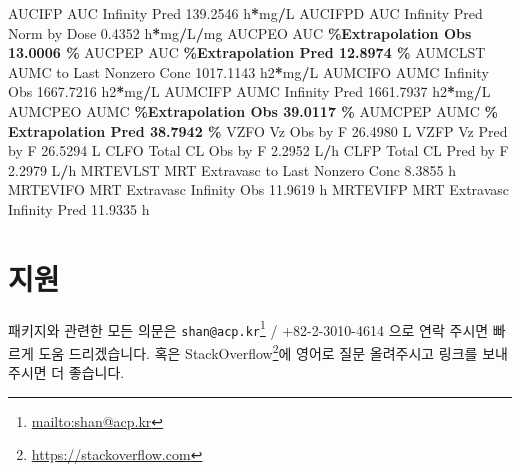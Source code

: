 \documentclass[
  10pt,
]{krantz}
\makeatletter
\newenvironment{Shaded}{\begin{snugshade}}{\end{snugshade}}
\newcommand{\FloatTok}[1]{\textcolor[rgb]{0.00,0.00,0.81}{#1}}
\newcommand{\NormalTok}[1]{#1}
\newcommand{\OperatorTok}[1]{\textcolor[rgb]{0.81,0.36,0.00}{\textbf{#1}}}
\renewcommand{\href}[2]{#2\footnote{\url{#1}}}
\newenvironment{kframe}{%
\medskip{}
\setlength{\fboxsep}{.8em}
 \def\at@end@of@kframe{}%
 \ifinner\ifhmode%
  \def\at@end@of@kframe{\end{minipage}}%
  \begin{minipage}{\columnwidth}%
 \fi\fi%
 \def\FrameCommand##1{\hskip\@totalleftmargin \hskip-\fboxsep
 \colorbox{shadecolor}{##1}\hskip-\fboxsep
     \hskip-\linewidth \hskip-\@totalleftmargin \hskip\columnwidth}%
 \MakeFramed {\advance\hsize-\width
   \@totalleftmargin\z@ \linewidth\hsize
   \@setminipage}}%
 {\par\unskip\endMakeFramed%
 \at@end@of@kframe}
\renewenvironment{Shaded}{\begin{kframe}}{\end{kframe}}
\makeatother
\begin{document}
\begin{Shaded}
\begin{Highlighting}[]
\NormalTok{AUCIFP     AUC Infinity Pred                             }\FloatTok{139.2546}\NormalTok{ h}\OperatorTok{*}\NormalTok{mg}\OperatorTok{/}\NormalTok{L}
\NormalTok{AUCIFPD    AUC Infinity Pred Norm by Dose                  }\FloatTok{0.4352}\NormalTok{ h}\OperatorTok{*}\NormalTok{mg}\OperatorTok{/}\NormalTok{L}\OperatorTok{/}\NormalTok{mg}
\NormalTok{AUCPEO     AUC }\OperatorTok{\%Extrapolation Obs                         13.0006 \%}
\NormalTok{AUCPEP     AUC }\OperatorTok{\%Extrapolation Pred                        12.8974 \%}
\NormalTok{AUMCLST    AUMC to Last Nonzero Conc                    }\FloatTok{1017.1143}\NormalTok{ h2}\OperatorTok{*}\NormalTok{mg}\OperatorTok{/}\NormalTok{L}
\NormalTok{AUMCIFO    AUMC Infinity Obs                            }\FloatTok{1667.7216}\NormalTok{ h2}\OperatorTok{*}\NormalTok{mg}\OperatorTok{/}\NormalTok{L}
\NormalTok{AUMCIFP    AUMC Infinity Pred                           }\FloatTok{1661.7937}\NormalTok{ h2}\OperatorTok{*}\NormalTok{mg}\OperatorTok{/}\NormalTok{L}
\NormalTok{AUMCPEO    AUMC }\OperatorTok{\%Extrapolation Obs                        39.0117 \%}
\NormalTok{AUMCPEP    AUMC }\OperatorTok{\% Extrapolation Pred                      38.7942 \%}
\NormalTok{VZFO       Vz Obs by F                                    }\FloatTok{26.4980}\NormalTok{ L}
\NormalTok{VZFP       Vz Pred by F                                   }\FloatTok{26.5294}\NormalTok{ L}
\NormalTok{CLFO       Total CL Obs by F                               }\FloatTok{2.2952}\NormalTok{ L}\OperatorTok{/}\NormalTok{h}
\NormalTok{CLFP       Total CL Pred by F                              }\FloatTok{2.2979}\NormalTok{ L}\OperatorTok{/}\NormalTok{h}
\NormalTok{MRTEVLST   MRT Extravasc to Last Nonzero Conc              }\FloatTok{8.3855}\NormalTok{ h}
\NormalTok{MRTEVIFO   MRT Extravasc Infinity Obs                     }\FloatTok{11.9619}\NormalTok{ h}
\NormalTok{MRTEVIFP   MRT Extravasc Infinity Pred                    }\FloatTok{11.9335}\NormalTok{ h}
\end{Highlighting}
\end{Shaded}

\hypertarget{support}{%
\chapter{지원}\label{support}}

패키지와 관련한 모든 의문은 \href{mailto:shan@acp.kr}{\nolinkurl{shan@acp.kr}} / +82-2-3010-4614 으로 연락 주시면 빠르게 도움 드리겠습니다.
혹은 StackOverflow\footnote{\url{https://stackoverflow.com}}에 영어로 질문 올려주시고 링크를 보내주시면 더 좋습니다.
\end{document}
